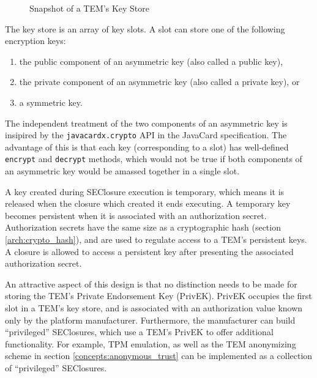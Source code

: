 \begin{figure}[hbtp]
	\caption{Snapshot of a TEM's Key Store}
	\label{fig:key_store}
\end{figure}

The key store is an array of key slots. A slot can store one of the following
encryption keys:
\begin{enumerate}
  \item the public component of an asymmetric key (also called a public key),
  \item the private component of an asymmetric key (also called a private key),
  or
  \item a symmetric key.
\end{enumerate}

The independent treatment of the two components of an asymmetric key is
insipired by the \texttt{javacardx.crypto} API in the JavaCard specification.
The advantage of this is that each key (corresponding to a slot) has
well-defined \texttt{encrypt} and \texttt{decrypt} methods, which would not be
true if both components of an asymmetric key would be amassed together in a
single slot.

A key created during SEClosure execution is temporary, which means it is released
when the closure which created it ends executing. A temporary key becomes
persistent when it is associated with an authorization secret. Authorization
secrets have the same size as a cryptographic hash (section
\ref{arch:crypto_hash}), and are used to regulate access to a TEM's persistent
keys. A closure is allowed to access a persistent key after presenting the
associated authorization secret.

An attractive aspect of this design is that no distinction needs to be made
for storing the TEM's Private Endorsement Key (PrivEK). PrivEK occupies the
first slot in a TEM's key store, and is associated with an authorization value
known only by the platform manufacturer. Furthermore, the manufacturer can
build ``privileged'' SEClosures, which use a TEM's PrivEK to offer additional
functionality. For example, TPM emulation, as well as the TEM anonymizing
scheme in section \ref{concepts:anonymous_trust} can be implemented as a
collection of ``privileged'' SEClosures.

